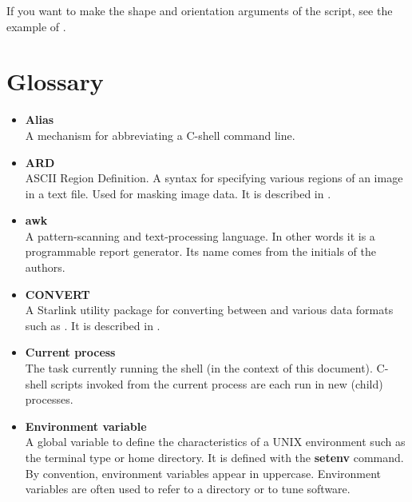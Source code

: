If you want to make the shape and orientation arguments of the script,
see the example of 
.

\newpage
\section{Glossary\label{sc4_sc:glossary}}

\begin{itemize}

\item {\bf\label{sc4_gl_alias}Alias}\\
      A mechanism for abbreviating a C-shell command line.

\item {\bf\label{sc4_gl_ard}ARD}\\
      ASCII Region Definition.  A syntax for specifying various
      regions of an image in a text file.  Used for masking image data.
      It is described in .

\item {\bf\label{sc4_gl_awk}awk}\\
      A pattern-scanning and text-processing language.  In other words
      it is a programmable report generator.  Its name comes from the
      initials of the authors.

\item {\bf\label{sc4_gl_convert}CONVERT}\\
      A Starlink utility package for converting between
       and various data formats such as
      .  It is described in
      .

\item {\bf\label{sc4_gl_cur}Current process}\\
      The task currently running the shell (in the context of this
      document).  C-shell scripts invoked from the current process
      are each run in new (child) processes. 

\item {\bf\label{sc4_gl_env}Environment variable}\\
      A global variable to define the characteristics of a UNIX
      environment such as the terminal type or home directory.  It is
      defined with the {\bf setenv} command.  By convention, environment
      variables appear in uppercase.  Environment variables are often
      used to refer to a directory or to tune software.


\end{itemize}
